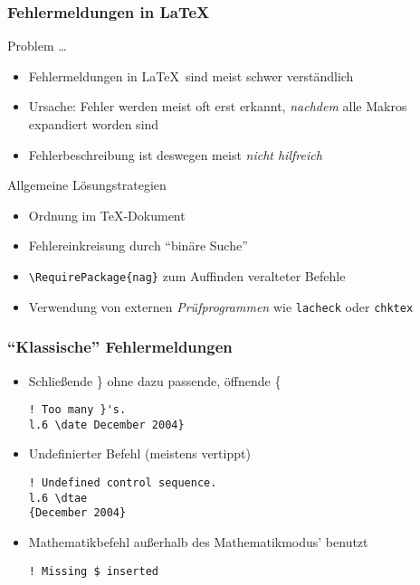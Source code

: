 \begin{frame}[fragile]
  \frametitle{Fehlermeldungen in \LaTeX}

  \onslide<+->

  \begin{block}{Problem \dots}
    \begin{itemize}
    \item<+-> Fehlermeldungen in \LaTeX\ sind meist schwer verständlich
    \item<+-> Ursache: Fehler werden meist oft erst erkannt, \emph{nachdem} alle
      Makros expandiert worden sind
    \item<+-> Fehlerbeschreibung ist deswegen meist \emph{nicht hilfreich}
    \end{itemize}
  \end{block}

  \onslide<+->

  \begin{block}{Allgemeine Lösungstrategien}
    \begin{itemize}
    \item<+-> Ordnung im \TeX-Dokument
    \item<+-> Fehlereinkreisung durch \enquote{binäre Suche}
    \item<+-> \lstinline|\RequirePackage{nag}| zum Auffinden veralteter Befehle
    \item<+-> Verwendung von externen \emph{Prüfprogrammen} wie \texttt{lacheck}
      oder \texttt{chktex}
    \end{itemize}
  \end{block}

\end{frame}

\begin{frame}[fragile]
  \frametitle{\enquote{Klassische} Fehlermeldungen}

  \onslide<+->

  \begin{itemize}
  \item<+-> Schließende \} ohne dazu passende, öffnende \{

\begin{verbatim}
! Too many }'s.
l.6 \date December 2004}
\end{verbatim}

  \item<+-> Undefinierter Befehl (meistens vertippt)

\begin{verbatim}
! Undefined control sequence.
l.6 \dtae
{December 2004}
\end{verbatim}

  \item<+-> Mathematikbefehl außerhalb des Mathematikmodus' benutzt

\begin{verbatim}
! Missing $ inserted
\end{verbatim}

  \end{itemize}

\end{frame}

